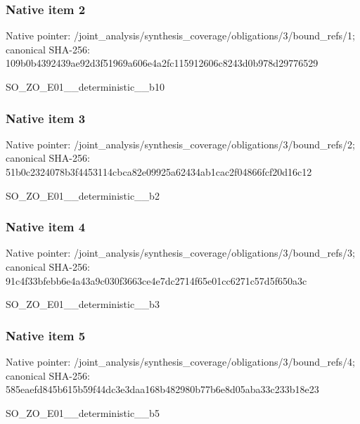 \documentclass[10pt,a4paper]{article}
\begin{document}
\subsubsection{Native item 2}
Native pointer: /joint\_\allowbreak{}analysis/synthesis\_\allowbreak{}coverage/obligations/3/bound\_\allowbreak{}refs/1; canonical SHA-256: 109b0b4392439ae92d3f51969a606e4a2fc115912606c8243d0b978d29776529

\begingroup\raggedright\sloppy SO\_\allowbreak{}ZO\_\allowbreak{}E01\_\allowbreak{}\_\allowbreak{}deterministic\_\allowbreak{}\_\allowbreak{}b10\par\endgroup

\subsubsection{Native item 3}
Native pointer: /joint\_\allowbreak{}analysis/synthesis\_\allowbreak{}coverage/obligations/3/bound\_\allowbreak{}refs/2; canonical SHA-256: 51b0c2324078b3f4453114cbca82e09925a62434ab1cac2f04866fcf20d16c12

\begingroup\raggedright\sloppy SO\_\allowbreak{}ZO\_\allowbreak{}E01\_\allowbreak{}\_\allowbreak{}deterministic\_\allowbreak{}\_\allowbreak{}b2\par\endgroup

\subsubsection{Native item 4}
Native pointer: /joint\_\allowbreak{}analysis/synthesis\_\allowbreak{}coverage/obligations/3/bound\_\allowbreak{}refs/3; canonical SHA-256: 91c4f33bfebb6e4a43a9c030f3663ce4e7dc2714f65e01cc6271c57d5f650a3c

\begingroup\raggedright\sloppy SO\_\allowbreak{}ZO\_\allowbreak{}E01\_\allowbreak{}\_\allowbreak{}deterministic\_\allowbreak{}\_\allowbreak{}b3\par\endgroup

\subsubsection{Native item 5}
Native pointer: /joint\_\allowbreak{}analysis/synthesis\_\allowbreak{}coverage/obligations/3/bound\_\allowbreak{}refs/4; canonical SHA-256: 585eaefd845b615b59f44dc3e3daa168b482980b77b6e8d05aba33c233b18e23

\begingroup\raggedright\sloppy SO\_\allowbreak{}ZO\_\allowbreak{}E01\_\allowbreak{}\_\allowbreak{}deterministic\_\allowbreak{}\_\allowbreak{}b5\par\endgroup
\end{document}
